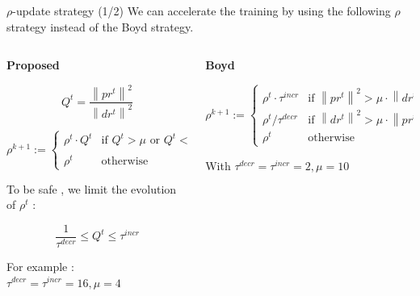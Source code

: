 \documentclass[aspectratio=1610,usenames,dvipsnames]{beamer}
\begin{document}
\begin{frame}{$\rho$-update strategy (1/2)}
We can accelerate the training by using the following $\rho$ strategy instead of the Boyd strategy.

\begin{columns}
    \begin{column}{0.48\textwidth}
        \begin{center}
            \large{\textbf{Proposed}}
        \end{center}
        $$
        Q^t = \frac{\left \| pr^t \right \|^2 }{\left \| dr^t \right \|^2 }
        $$
        
        $$
        \rho^{k+1} := \left\{\begin{matrix}
        \rho^t \cdot Q^t & \text{if }  Q^t  > \mu  \text{ or } Q^t < \frac{1}{\mu} \\ 
        \rho^t & \text{otherwise} 
        \end{matrix}\right.
        $$
        
        To be safe , we limit the evolution of $\rho^t$ :
        
        $$
        \frac{1}{\tau^{decr}} \leq Q^t \leq \tau^{incr}
        $$
        
        For example :  $\tau^{decr} = \tau^{incr} = 16, \mu = 4$
    
    \end{column}
    
    \begin{column}{0.48\textwidth}
    \begin{center}
            \large{\textbf{Boyd}}
    \end{center}
    
    $$
    \rho^{k+1} := \left\{\begin{matrix}
    \rho^t \cdot \tau^{incr} & \text{if }  \left \| pr^t \right \|^2   > \mu \cdot \left \| dr^t \right \|^2  \\ 
    \rho^t / \tau^{decr} & \text{if }  \left \| dr^t \right \|^2   > \mu \cdot \left \| pr^t \right \|^2  \\ 
    \rho^t & \text{otherwise} 
    \end{matrix}\right.
    $$
    
    With $\tau^{decr} = \tau^{incr} = 2, \mu = 10$
    
    \end{column}

\end{columns}

\end{frame}
\end{document}
